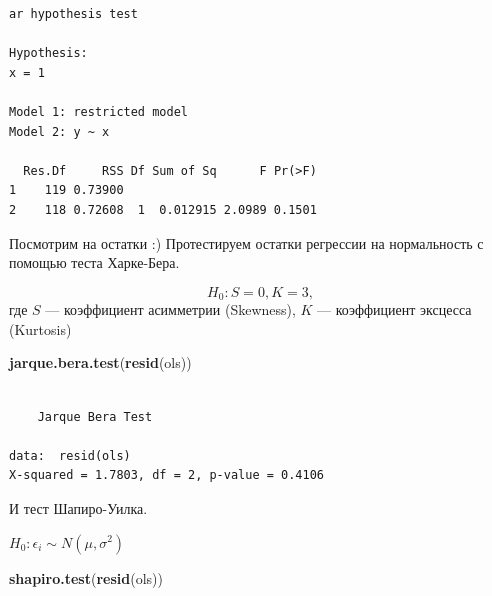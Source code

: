 \documentclass[]{book}
\newenvironment{Shaded}{\begin{snugshade}}{\end{snugshade}}
\newcommand{\KeywordTok}[1]{\textcolor[rgb]{0.13,0.29,0.53}{\textbf{#1}}}
\newcommand{\NormalTok}[1]{#1}
\begin{document}
\begin{verbatim}
ar hypothesis test

Hypothesis:
x = 1

Model 1: restricted model
Model 2: y ~ x

  Res.Df     RSS Df Sum of Sq      F Pr(>F)
1    119 0.73900                           
2    118 0.72608  1  0.012915 2.0989 0.1501
\end{verbatim}

Посмотрим на остатки :) Протестируем остатки регрессии на нормальность с помощью теста Харке-Бера.

\[
H_{0}: S = 0, K = 3,
\]
где \(S\) --- коэффициент асимметрии (Skewness), \(K\) --- коэффициент эксцесса (Kurtosis)

\begin{Shaded}
\begin{Highlighting}[]
\KeywordTok{jarque.bera.test}\NormalTok{(}\KeywordTok{resid}\NormalTok{(ols)) }
\end{Highlighting}
\end{Shaded}

\begin{verbatim}

    Jarque Bera Test

data:  resid(ols)
X-squared = 1.7803, df = 2, p-value = 0.4106
\end{verbatim}

И тест Шапиро-Уилка.

\(H_{0}: \epsilon_{i} \sim N(\mu,\sigma^2)\)

\begin{Shaded}
\begin{Highlighting}[]
\KeywordTok{shapiro.test}\NormalTok{(}\KeywordTok{resid}\NormalTok{(ols))}
\end{Highlighting}
\end{Shaded}
\end{document}
